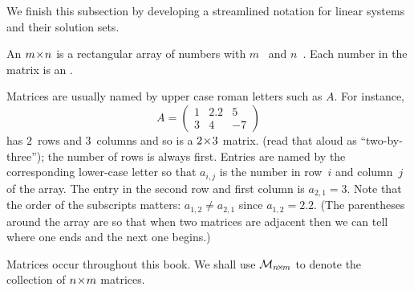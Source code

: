 We finish this subsection by developing a streamlined 
notation for linear systems 
and their solution sets.

\begin{definition}
An \( m \! \times \! n \) 
is a rectangular array of numbers
with \( m \)~ 
and \( n \)~.
Each number in the matrix is an 
.
\end{definition}

Matrices are usually named by upper case roman letters such as 
\( A \).
For instance,
\begin{equation*}
  A=
  \begin{pmatrix}
    1  &2.2  &5  \\
    3  &4    &-7
  \end{pmatrix}
\end{equation*}
has $2$~rows and $3$~columns and so
is a \( 2 \! \times \! 3 \) matrix.
(read that aloud as ``two-by-three'');
the number of rows is always first.
Entries are named by the corresponding lower-case letter
so that $a_{i,j}$
is the number in row~$i$ and column~$j$ of the array.
The entry in the second row and first column is \( a_{2,1}=3 \).
Note that the order of the subscripts matters: 
$a_{1,2}\neq a_{2,1}$ since \( a_{1,2}=2.2 \). 
(The parentheses around the array
are so that when 
two matrices are adjacent then
we can tell where one ends and the next one begins.)

Matrices occur throughout this book.
We shall use 
\( \mathcal{M}_{n \! \times \! m} \) to denote the collection of \( n \! \times \! m \)
matrices.

